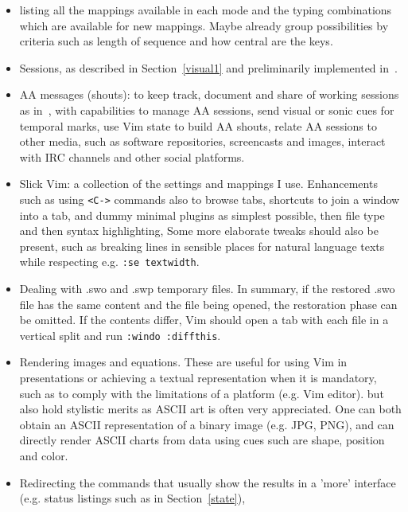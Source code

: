 \documentclass{article}
\newcommand{\ttt}[1] {
	\texttt{<#1>}}
\newcommand{\tttt}[1]{\texttt{#1}}
\begin{document}
    \begin{itemize}
      \item listing all the mappings available in each mode and the typing combinations which are available
        for new mappings.
        Maybe already group possibilities by criteria such as length
        of sequence and how central are the keys.
      \item Sessions, as described in Section~\ref{visual1} and preliminarily implemented in~\cite{vimrc}.
      \item AA messages (shouts): to keep track, document and share of working sessions
        as in~\cite{aa1,aa2}, with capabilities to manage AA sessions,
        send visual or sonic cues for temporal marks, use Vim state to build AA shouts,
        relate AA sessions to other media, such as software repositories,
        screencasts and images, interact with IRC channels and other social platforms.
      \item Slick Vim: a collection of the settings and mappings I use.
        Enhancements such as using \ttt{C-} commands also to browse tabs,
        shortcuts to join a window into a tab,
        and dummy minimal plugins as simplest possible, then file type
        and then syntax highlighting,
        Some more elaborate tweaks should also be present, such
        as breaking lines in sensible places for natural language texts
        while respecting e.g. \tttt{:se textwidth}.
      \item Dealing with .swo and .swp temporary files.
        In summary, if the restored .swo file has the same content
        and the file being opened,
        the restoration phase can be omitted.
        If the contents differ, Vim should open a tab with each file
        in a vertical split and run \tttt{:windo :diffthis}.
      \item Rendering images and equations.
        These are useful for using Vim in presentations
        or achieving a textual representation when it is mandatory,
        such as to comply with the limitations of a platform (e.g. Vim editor). 
        but also hold stylistic merits as ASCII art is often
        very appreciated.
        One can both obtain an ASCII representation of a binary image (e.g. JPG, PNG),
        and can directly render ASCII charts from data using cues such are shape, position
        and color.
      \item Redirecting the commands that usually show the results in
        a 'more' interface (e.g. status listings such as in
        Section~\ref{state}),

\end{itemize}
\end{document}
